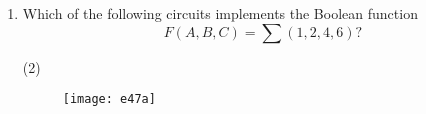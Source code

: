 \begin{enumerate}
\begin{figure}[H]
\centering
\texttt{[image: e41]}
\end{figure}
\begin{tasks}(2)
\task[\textbf{A.}] \begin{figure}[H]
	\centering
	\texttt{[image: e41a]}
\end{figure}
\task[\textbf{B.}] \begin{figure}[H]
	\centering
	\texttt{[image: e41b]}
\end{figure}
\task[\textbf{C.}] \begin{figure}[H]
	\centering
	\texttt{[image: e41c]}
\end{figure}
\task[\textbf{D.}] \begin{figure}[H]
	\centering
	\texttt{[image: e41d]}
\end{figure}
\end{tasks}
\begin{answer}
\begin{align*}
D_{A}=\overline{x y} \oplus A
\end{align*}
\begin{align*}
\renewcommand*{\arraystretch}{1.5}
\begin{tabular}{|c|c|c|c|}
\hline
Input
$x \quad y$&Present
State A&Flip-Flop
Input $D_{A}$&Next State
$\mathrm{A}$\\
\hline
0 0&0&1&1\\
\hline
0 0&1&0&0\\
\hline
0 1&0&1&1\\
\hline
0 1&1&0&0\\
\hline
1 0&0&1&1\\
\hline
1 0& 1& 0&0\\
\hline
1 1&0&0&0\\
\hline
1 1&1&1&1\\
\hline
\end{tabular}
\end{align*}
So the correct answer is \textbf{Option (D)}
\end{answer}
	\item Which of the following circuits implements the Boolean function
	$$F(A, B, C)=\sum(1,2,4,6) ?$$
\begin{tasks}(2)
\task[\textbf{A.}] \begin{figure}[H]
	\centering
	\texttt{[image: e47a]}
\end{figure}
\task[\textbf{B.}] \begin{figure}[H]

\end{figure}
\end{tasks}
\end{enumerate}
